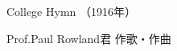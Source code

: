 \documentclass[10pt,b5j]{tarticle} %
\begin{document}
\begin{minipage}[c]{0.7\hsize} %
    \begin{center}
        {\LARGE
            College Hymn %
        }
        {\small 
            （1916年） %
        }
    \end{center}
\end{minipage}
\begin{minipage}[c]{0.3\hsize} %
    \begin{flushright} %
        Prof.Paul Rowland君 作歌・作曲 %
    \end{flushright}
\end{minipage}
\end{document}
